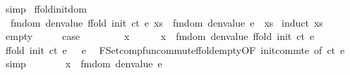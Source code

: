 \begin{isabellebody}
\ simp%
\endisatagproof
{\isafoldproof}%
%
\isadelimproof
\isanewline
%
\endisadelimproof
\isanewline
{}\isamarkupfalse%
\ ffold{\isacharunderscore}{\kern0pt}init{\isacharunderscore}{\kern0pt}dom{\isacharcolon}{\kern0pt}\isanewline
\ \ {\isachardoublequoteopen}fmdom\ {\isacharparenleft}{\kern0pt}denvalue\ {\isacharparenleft}{\kern0pt}ffold\ {\isacharparenleft}{\kern0pt}init\ ct{\isacharparenright}{\kern0pt}\ e\ xs{\isacharparenright}{\kern0pt}{\isacharparenright}{\kern0pt}\ {\isacharbar}{\kern0pt}{\isasymsubseteq}{\isacharbar}{\kern0pt}\ fmdom\ {\isacharparenleft}{\kern0pt}denvalue\ e{\isacharparenright}{\kern0pt}\ {\isacharbar}{\kern0pt}{\isasymunion}{\isacharbar}{\kern0pt}\ xs{\isachardoublequoteclose}\isanewline
%
\isadelimproof
%
\endisadelimproof
%
\isatagproof
{}\isamarkupfalse%
\ {\isacharparenleft}{\kern0pt}induct\ {\isachardoublequoteopen}xs{\isachardoublequoteclose}{\isacharparenright}{\kern0pt}\isanewline
\ \ \isamarkupfalse%
\ empty\isanewline
\ \ \isamarkupfalse%
\ \isamarkupfalse%
\ {\isacharquery}{\kern0pt}case\isanewline
\ \ \isamarkupfalse%
\isanewline
\ \ \ \ \isamarkupfalse%
\ x\isanewline
\ \ \ \ \isamarkupfalse%
\ {\isachardoublequoteopen}x\ {\isacharbar}{\kern0pt}{\isasymin}{\isacharbar}{\kern0pt}\ fmdom\ {\isacharparenleft}{\kern0pt}denvalue\ {\isacharparenleft}{\kern0pt}ffold\ {\isacharparenleft}{\kern0pt}init\ ct{\isacharparenright}{\kern0pt}\ e\ {\isacharbraceleft}{\kern0pt}{\isacharbar}{\kern0pt}{\isacharbar}{\kern0pt}{\isacharbraceright}{\kern0pt}{\isacharparenright}{\kern0pt}{\isacharparenright}{\kern0pt}{\isachardoublequoteclose}\isanewline
\isanewline
\ \ \ \ \isamarkupfalse%
\ \isamarkupfalse%
\ {\isachardoublequoteopen}ffold\ {\isacharparenleft}{\kern0pt}init\ ct{\isacharparenright}{\kern0pt}\ e\ {\isacharbraceleft}{\kern0pt}{\isacharbar}{\kern0pt}{\isacharbar}{\kern0pt}{\isacharbraceright}{\kern0pt}\ {\isacharequal}{\kern0pt}\ e{\isachardoublequoteclose}\ \isamarkupfalse%
\ FSet{\isachardot}{\kern0pt}comp{\isacharunderscore}{\kern0pt}fun{\isacharunderscore}{\kern0pt}commute{\isachardot}{\kern0pt}ffold{\isacharunderscore}{\kern0pt}empty{\isacharbrackleft}{\kern0pt}OF\ init{\isacharunderscore}{\kern0pt}commte{\isacharcomma}{\kern0pt}\ of\ ct\ e{\isacharbrackright}{\kern0pt}\ \isamarkupfalse%
\ simp\isanewline
\ \ \ \ \isamarkupfalse%
\ \isamarkupfalse%
\ {\isachardoublequoteopen}x\ {\isacharbar}{\kern0pt}{\isasymin}{\isacharbar}{\kern0pt}\ fmdom\ {\isacharparenleft}{\kern0pt}denvalue\ e{\isacharparenright}{\kern0pt}\ {\isacharbar}{\kern0pt}{\isasymunion}{\isacharbar}{\kern0pt}\ {\isacharbraceleft}{\kern0pt}{\isacharbar}{\kern0pt}{\isacharbar}{\kern0pt}{\isacharbraceright}{\kern0pt}{\isachardoublequoteclose}\ \isamarkupfalse%

\end{isabellebody}
